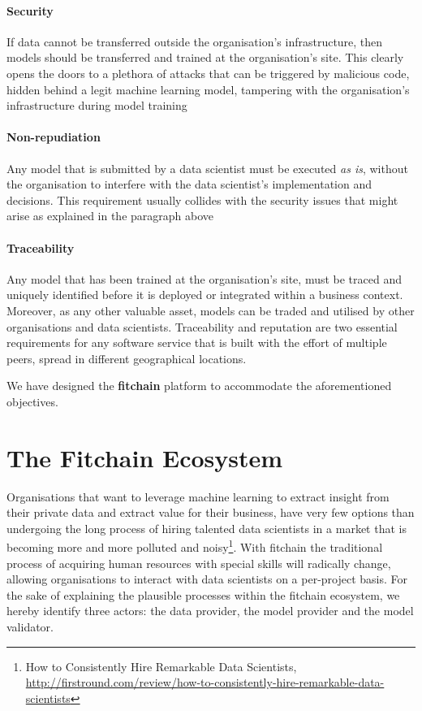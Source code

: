 \documentclass[12pt, a4paper,titlepage]{extreport}
\begin{document}
\paragraph{Security}
If data cannot be transferred outside the organisation's infrastructure, then models should be transferred and trained at the organisation's site. This clearly opens the doors to a plethora of attacks that can be triggered by malicious code, hidden behind a legit machine learning model, tampering with the organisation's infrastructure during model training

\paragraph{Non-repudiation}
Any model that is submitted by a data scientist must be executed \textit{as is}, without the organisation to interfere with the data scientist's implementation and decisions. This requirement usually collides with the security issues that might arise as explained in the paragraph above

\paragraph{Traceability}
Any model that has been trained at the organisation's site, must be traced and uniquely identified before it is deployed or integrated within a business context. Moreover, as any other valuable asset, models can be traded and utilised by other organisations and data scientists. Traceability and reputation are two essential requirements for any software service that is built with the effort of multiple peers, spread in different geographical locations.

We have designed the \textbf{fitchain} platform to accommodate the aforementioned objectives. 


\section{The Fitchain Ecosystem}\label{ecosystem}
Organisations that want to leverage machine learning to extract insight from their private data and extract value for their business, have very few options than undergoing the long process of hiring talented data scientists in a market that is becoming more and more polluted and noisy\footnote{How to Consistently Hire Remarkable Data Scientists, \url{http://firstround.com/review/how-to-consistently-hire-remarkable-data-scientists}}. 
With fitchain the traditional process of acquiring human resources with special skills will radically change, allowing organisations to interact with data scientists on a per-project basis. For the sake of explaining the plausible processes within the fitchain ecosystem, we hereby identify three actors: the data provider, the model provider and  the model validator.
\end{document}
